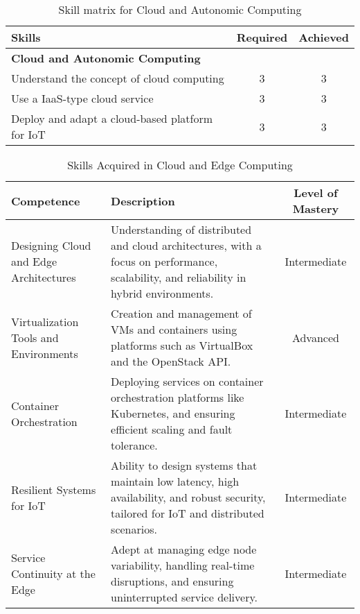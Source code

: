 \begin{table}[H]
    \centering
    \renewcommand{\arraystretch}{1.5} %
    \begin{tabular}{|p{11cm}|c|c|}
    \hline
    \rowcolor[gray]{0.8}
    \textbf{Skills} & \textbf{Required} & \textbf{Achieved} \\ \hline
    \rowcolor[gray]{0.9} \textbf{Cloud and Autonomic Computing} &  &  \\ \hline
    Understand the concept of cloud computing & 3 & 3 \\ \hline
    Use a IaaS-type cloud service & 3 & 3 \\ \hline
    Deploy and adapt a cloud-based platform for IoT & 3 & 3 \\ \hline
    \end{tabular}
    \caption{Skill matrix for Cloud and Autonomic Computing}
    \label{table:skills_for_cloud_and_autonomic_computing}
\end{table}

\begin{table}[H]
    \centering
    \renewcommand{\arraystretch}{1.5}
    \begin{tabular}{|p{3.5cm}|p{8cm}|c|}
    \hline
    \rowcolor[gray]{0.8}
    \textbf{Competence} & \textbf{Description} & \textbf{Level of Mastery} \\
    \hline
    Designing Cloud and Edge Architectures & Understanding of distributed and cloud architectures, with a focus on performance, scalability, and reliability in hybrid environments. & Intermediate \\
    \hline
    Virtualization Tools and Environments & Creation and management of VMs and containers using platforms such as VirtualBox and the OpenStack API. & Advanced \\
    \hline
    Container Orchestration & Deploying services on container orchestration platforms like Kubernetes, and ensuring efficient scaling and fault tolerance. & Intermediate \\
    \hline
    Resilient Systems for IoT & Ability to design systems that maintain low latency, high availability, and robust security, tailored for IoT and distributed scenarios. & Intermediate \\
    \hline
    Service Continuity at the Edge & Adept at managing edge node variability, handling real-time disruptions, and ensuring uninterrupted service delivery. & Intermediate \\
    \hline
    \end{tabular}
    \caption{Skills Acquired in Cloud and Edge Computing}
\end{table}


